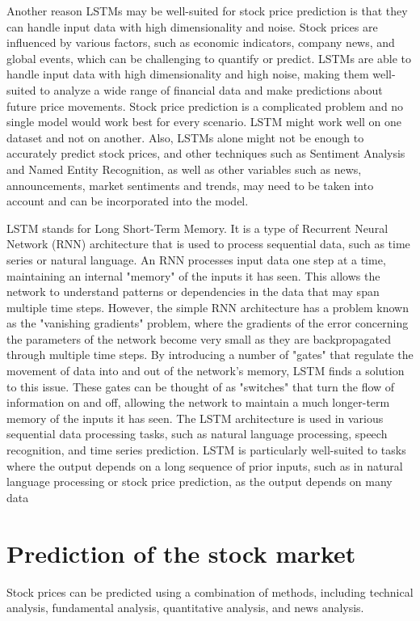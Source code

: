 Another reason LSTMs may be well-suited for stock price prediction is that they can handle input data with high dimensionality and noise. Stock prices are influenced by various factors, such as economic indicators, company news, and global events, which can be challenging to quantify or predict. LSTMs are able to handle input data with high dimensionality and high noise, making them well-suited to analyze a wide range of financial data and make predictions about future price movements.
Stock price prediction is a complicated problem and no single model would work best for every scenario. LSTM might work well on one dataset and not on another. Also, LSTMs alone might not be enough to accurately predict stock prices, and other techniques such as Sentiment Analysis and Named Entity Recognition, as well as other variables such as news, announcements, market sentiments and trends, may need to be taken into account and can be incorporated into the model.
\par
\bigskip
LSTM stands for Long Short-Term Memory. It is a type of Recurrent Neural Network (RNN) architecture that is used to process sequential data, such as time series or natural language.
An RNN processes input data one step at a time, maintaining an internal "memory" of the inputs it has seen. This allows the network to understand patterns or dependencies in the data that may span multiple time steps. However, the simple RNN architecture has a problem known as the "vanishing gradients" problem, where the gradients of the error concerning the parameters of the network become very small as they are backpropagated through multiple time steps.
By introducing a number of "gates" that regulate the movement of data into and out of the network's memory, LSTM finds a solution to this issue. These gates can be thought of as "switches" that turn the flow of information on and off, allowing the network to maintain a much longer-term memory of the inputs it has seen.
The LSTM architecture is used in various sequential data processing tasks, such as natural language processing, speech recognition, and time series prediction. LSTM is particularly well-suited to tasks where the output depends on a long sequence of prior inputs, such as in natural language processing or stock price prediction, as the output depends on many data

\section{Prediction of the stock market}
Stock prices can be predicted using a combination of methods, including technical analysis, fundamental analysis, quantitative analysis, and news analysis.

